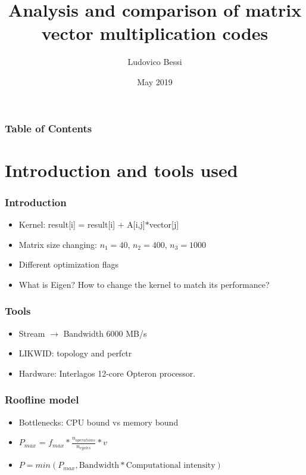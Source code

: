 \documentclass{beamer}
\title {Analysis and comparison of matrix vector multiplication codes}
\author %
{Ludovico Bessi}
\institute[VFU] %
{
  Matematica per l'ingegneria\\
  Politecnico di Torino
}
\date{May 2019}
\begin{document}
 
\frame{\titlepage}

\begin{frame}
\frametitle{Table of Contents}
\tableofcontents
\end{frame}

\section{Introduction and tools used}
\begin{frame}
\frametitle{Introduction}
\begin{itemize}
 \item Kernel: result[i] = result[i] + A[i,j]$*$vector[j]
 \item Matrix size changing: $n_1 = 40$, $n_2 = 400$, $n_3 = 1000$
 \item Different optimization flags 
 \item What is Eigen? How to change the kernel to match its performance?
\end{itemize}
\end{frame}

\begin{frame}
\frametitle{Tools}
\begin{itemize}
\item  Stream $\to$ Bandwidth 6000 MB/s
\item LIKWID: topology and perfctr
\item Hardware: Interlagos 12-core Opteron processor.
\end{itemize}
\end{frame}

\begin{frame}
\frametitle{Roofline model}
\begin{itemize}
\item  Bottlenecks: CPU bound vs memory bound
\item  $P_{max}$ = $f_{max} * \frac{n_{operations}}{n_{cycles}} * v$
\item  $P = min(P_{max}, \text{Bandwidth} * \text{Computational intensity})$
\end{itemize}




\end{frame}


\end{document}
